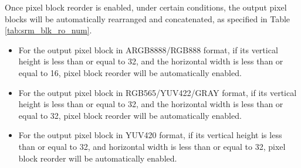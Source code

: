 \documentclass[main\_\_EN.tex]{subfiles}
\begin{document}
Once pixel block reorder is enabled, under certain conditions, the output pixel blocks will be automatically rearranged and concatenated, as specified in Table \ref{tab:srm_blk_ro_num}.

\begin{itemize}
    \item For the output pixel block in ARGB8888/RGB888 format, if its vertical height is less than or equal to 32, and the horizontal width is less than or equal to 16, pixel block reorder will be automatically enabled.
    \item For the output pixel block in RGB565/YUV422/GRAY format, if its vertical height is less than or equal to 32, and the horizontal width is less than or equal to 32, pixel block reorder will be automatically enabled.
    \item For the output pixel block in YUV420 format, if its vertical height is less than or equal to 32, and horizontal width is less than or equal to 32, pixel block reorder will be automatically enabled.
\end{itemize}
\end{document}
